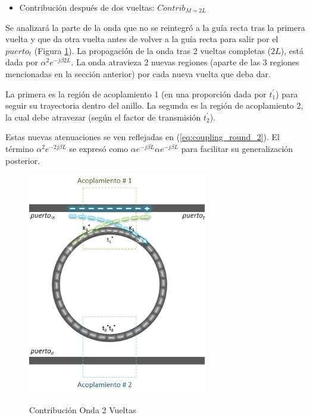 \begin{itemize}
\item Contribución después de dos vueltas: $Contrib_{M=2L}$
\end{itemize} 

Se analizará la parte de la onda que no se reintegró a la guía recta tras la primera vuelta
y que da otra vuelta antes de volver a la guía recta para salir por el $puerto_t$
(Figura \ref{fig:rr_n2}).
La propagación de la onda tras 2 vueltas completas ($2L$), está dada por 
$\alpha^2 e^{-j \beta 2L}$.
La onda atravieza 2 nuevas regiones (aparte de las 3 regiones mencionadas en la sección anterior)
por cada nueva vuelta que deba dar. 

La primera es la región de acoplamiento 1 (en una proporción dada por $t_1^{'}$) 
para seguir su trayectoria dentro del anillo.
La segunda es la región de acoplamiento 2, la cual debe atravezar (según el factor de 
transmisión $t_2^{'}$).

Estas nuevas atenuaciones se ven reflejadas en (\ref{eq:coupling_round_2}). 
El término $\alpha^2 e^{-2j \beta L}$ se expresó como
 $\alpha e^{-j \beta L} \alpha e^{-j \beta L}$ para facilitar
su generalización posterior.

\begin{figure}[h!]
\caption{Contribución Onda 2 Vueltas}
\centering
\includegraphics[width=0.7\textwidth,natwidth=397,natheight=493]{figs/rr_n2.PNG}
\label{fig:rr_n2}
\end{figure} 

